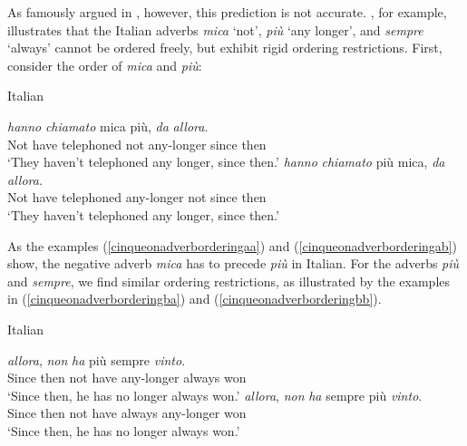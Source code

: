 As famously argued in \citet{cinque1999adverbs}, however, this prediction is not accurate. \citet[5--6]{cinque1999adverbs}, for example, illustrates that the Italian adverbs \textit{mica} `not', \textit{più} `any longer', and \textit{sempre} `always' cannot be ordered freely, but exhibit rigid ordering restrictions. First, consider the order of \textit{mica} and \textit{più}:

\begin{exe} 
\ex Italian \citep[5]{cinque1999adverbs} \label{cinqueonadverborderingbiga} \begin{xlist} 
\ex {} {\textit{hanno}} {\textit{chiamato}} {mica} {più,} {\textit{da}} {\textit{allora}.}  \\
{Not} {have} {telephoned} {not} {any-longer} {since} {then}\\
\trans `They haven't telephoned any longer, since then.' \label{cinqueonadverborderingaa}
\ex \gll {} {\textit{hanno}} {\textit{chiamato}} {più} {mica,} {\textit{da}} {\textit{allora}.}  \\
{Not} {have} {telephoned} {any-longer} {not} {since} {then}\\
\trans `They haven't telephoned any longer, since then.' \label{cinqueonadverborderingab}
\end{xlist} 
\end{exe}

\noindent As the examples (\ref{cinqueonadverborderingaa}) and (\ref{cinqueonadverborderingab}) show, the negative adverb \textit{mica} has to precede \textit{più} in Italian. For the adverbs \textit{più} and \textit{sempre}, we find similar ordering restrictions, as illustrated by the examples in (\ref{cinqueonadverborderingba}) and (\ref{cinqueonadverborderingbb}).

\begin{exe} 
\ex Italian \citep[6]{cinque1999adverbs}\label{cinqueonadverborderingbigb} \begin{xlist} 
\ex {} {\textit{allora},} {\textit{non}} {\textit{ha}} {più} {sempre} {\textit{vinto}.}  \\
{Since} {then} {not} {have} {any-longer} {always} {won}\\
\trans `Since then, he has no longer always won.' \label{cinqueonadverborderingba}
\ex \gll {} {\textit{allora},} {\textit{non}} {\textit{ha}} {sempre} {più} {\textit{vinto}.}  \\
{Since} {then} {not} {have} {always} {any-longer} {won}\\
\trans `Since then, he has no longer always won.'  \label{cinqueonadverborderingbb}
\end{xlist} 
\end{exe}

